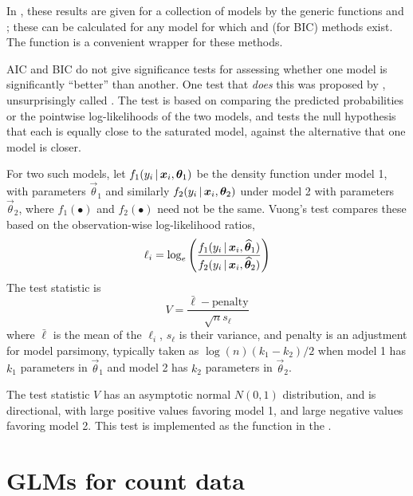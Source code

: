 \documentclass[11pt]{book}\usepackage[]{graphicx}\usepackage[]{color}
\begin{document}
In \R, these results are given for a collection of models by the generic functions
 and ; these can be calculated for any model for which
 and (for BIC)  methods exist.
The  function  is a convenient wrapper for these
methods.

AIC and BIC do not give significance tests for assessing whether one model is
significantly ``better'' than another.  One test that \emph{does} this was proposed by
\citet{Vuong:1989}, unsurprisingly called .
The test is based on comparing the predicted probabilities
or the pointwise log-likelihoods of the two models, and tests the null hypothesis
that each is equally close to the saturated model, against the alternative that
one model is closer.

For two such models, let $f_1 (y_i \, | \, \bm{x}_i, \bm{\theta}_1)$
be the density function under model 1, with parameters $\vec{\theta}_1$
and similarly
$f_2 (y_i \, | \, \bm{x}_i, \bm{\theta}_2)$ under model 2 with parameters $\vec{\theta}_2$,
where $f_1(\bullet)$ and $f_2(\bullet)$ need not be the same.
Vuong's test compares these based on the observation-wise log-likelihood ratios,
\begin{equation*}
\ell_i = \log_e \left(
              \frac{f_1 (y_i \, | \, \bm{x}_i, \bm{\widehat{\theta}}_1)}
                   {f_2 (y_i \, | \, \bm{x}_i, \bm{\widehat{\theta}}_2)} \right)
\end{equation*}
The test statistic is
\begin{equation*}
 V = \frac{\bar{\ell} - \textrm{penalty}} {\sqrt{n} s_\ell}
\end{equation*}
where $\bar{\ell}$ is the mean of the $\ell_i$, $s_\ell$ is their variance, and
penalty is an adjustment for model parsimony, typically taken as
$\log(n) (k_1 - k_2)/2$ when model 1 has $k_1$ parameters in $\vec{\theta}_1$
and model 2 has $k_2$ parameters in $\vec{\theta}_2$.

The test statistic $V$ has an asymptotic normal $N(0,1)$ distribution,
and is directional, with large positive values favoring model 1, and large
negative values favoring model 2.
This test is implemented as the  function in the .

\section{GLMs for count data}\label{sec:glm-count}
\end{document}
